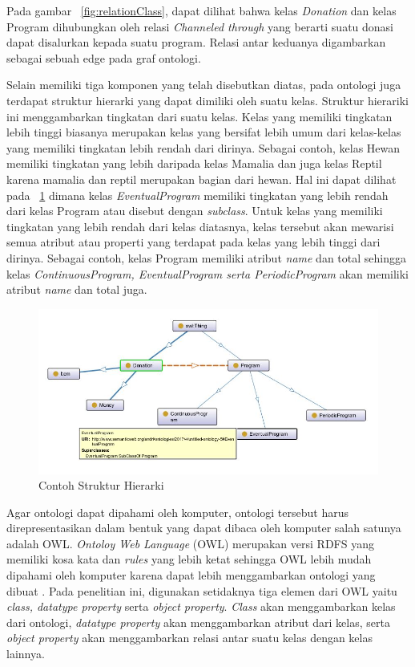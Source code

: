 Pada gambar \pic~\ref{fig:relationClass}, dapat dilihat bahwa kelas \textit{Donation} dan kelas Program dihubungkan oleh relasi \textit{Channeled through} yang berarti suatu donasi dapat disalurkan kepada suatu program. Relasi antar keduanya digambarkan sebagai sebuah edge pada graf ontologi. 

Selain memiliki tiga komponen yang telah disebutkan diatas, pada ontologi juga terdapat struktur hierarki yang dapat dimiliki oleh suatu kelas. Struktur hierariki ini menggambarkan tingkatan dari suatu kelas. Kelas yang memiliki tingkatan lebih tinggi biasanya merupakan kelas yang bersifat lebih umum dari kelas-kelas yang memiliki tingkatan lebih rendah dari dirinya. Sebagai contoh, kelas Hewan memiliki tingkatan yang lebih daripada kelas Mamalia dan juga kelas Reptil karena mamalia dan reptil merupakan bagian dari hewan. Hal ini dapat dilihat pada \pic~\ref{fig:subClass} dimana kelas \textit{EventualProgram} memiliki tingkatan yang lebih rendah dari kelas Program atau disebut dengan \textit{subclass}. Untuk kelas yang memiliki tingkatan yang lebih rendah dari kelas diatasnya, kelas tersebut akan mewarisi semua atribut atau properti yang terdapat pada kelas yang lebih tinggi dari dirinya. Sebagai contoh, kelas Program memiliki atribut \textit{name} dan total sehingga kelas \textit{ContinuousProgram, EventualProgram serta PeriodicProgram} akan memiliki atribut \textit{name} dan total juga.

\begin{figure}
	\centering
	\includegraphics[width=1\textwidth]
	{pics/subClass.jpg}
	\caption{Contoh Struktur Hierarki}
	\label{fig:subClass}
\end{figure}
\vspace{-0.3cm}

Agar ontologi dapat dipahami oleh komputer, ontologi tersebut harus direpresentasikan dalam bentuk yang dapat dibaca oleh komputer salah satunya adalah OWL. \textit{Ontoloy Web Language} (OWL) merupakan versi RDFS yang memiliki kosa kata dan \textit{rules} yang lebih ketat sehingga OWL lebih mudah dipahami oleh komputer karena dapat lebih menggambarkan ontologi yang dibuat \citep{owl.overview}. Pada penelitian ini, digunakan setidaknya tiga elemen dari OWL yaitu \textit{class, datatype property} serta \textit{object property}. \textit{Class} akan menggambarkan kelas dari ontologi, \textit{datatype property} akan menggambarkan atribut dari kelas, serta \textit{object property} akan menggambarkan relasi antar suatu kelas dengan kelas lainnya.
